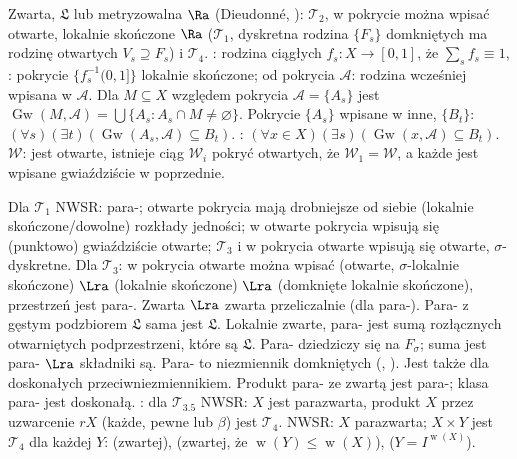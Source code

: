 Zwarta,  $\mathfrak L$ lub metryzowalna $\Ra$  (Dieudonné, ): $\mathcal T_2$, w pokrycie można wpisać otwarte, lokalnie skończone $\Ra$  ($\mathcal T_1$, dyskretna rodzina $\{F_s\}$ domkniętych ma rodzinę otwartych $V_s \supseteq F_s$) i $\mathcal T_4$.
: rodzina ciągłych $f_s \colon X \to [0,1]$, że $\sum_s f_s \equiv 1$, : pokrycie $\{f^{-1}_s(0,1]\}$ lokalnie skończone;  od pokrycia $\mathcal A$: rodzina wcześniej wpisana w $\mathcal A$.
Dla $M \subseteq X$  względem pokrycia $\mathcal A = \{A_s\}$ jest $\operatorname{Gw}(M, \mathcal A)  = \bigcup\{A_s : A_s \cap M \neq \varnothing\}$.
Pokrycie $\{A_s\}$ wpisane  w inne, $\{B_t\}$: $(\forall s)(\exists t)(\operatorname{Gw}(A_s, \mathcal A) \subseteq B_t)$.
: $(\forall x \in X)(\exists s)(\operatorname{Gw}(x, \mathcal A) \subseteq B_t)$.
 $\mathcal W$: jest otwarte, istnieje ciąg $\mathcal W_i$ pokryć otwartych, że $\mathcal W_1 = \mathcal W$, a każde jest wpisane gwiaździście w poprzednie.

Dla $\mathcal T_1$ NWSR: para-; otwarte pokrycia mają drobniejsze od siebie (lokalnie skończone/dowolne) rozkłady jedności; w otwarte pokrycia wpisują się (punktowo) gwiaździście otwarte; $\mathcal T_3$ i w pokrycia otwarte wpisują się otwarte, $\sigma$-dyskretne.
Dla $\mathcal T_3$: w pokrycia otwarte można wpisać (otwarte, $\sigma$-lokalnie skończone) $\Lra$ (lokalnie skończone) $\Lra$ (domknięte lokalnie skończone), przestrzeń jest para-.
Zwarta $\Lra$ zwarta przeliczalnie (dla para-).
Para- z gęstym podzbiorem $\mathfrak L$ sama jest $\mathfrak L$.
Lokalnie zwarte, para- jest sumą rozłącznych otwarniętych podprzestrzeni, które są $\mathfrak L$.
Para- dziedziczy się na $F_\sigma$; suma jest para- $\Lra$ składniki są.
Para- to niezmiennik domkniętych (, ).
Jest także dla doskonałych przeciwniezmiennikiem.
Produkt para- ze zwartą jest para-; klasa para- jest doskonałą.
: dla $\mathcal T_{3.5}$ NWSR: $X$ jest parazwarta, produkt $X$ przez uzwarcenie $rX$ (każde, pewne lub $\beta$) jest $\mathcal T_4$.
NWSR: $X$ parazwarta; $X \times Y$ jest $\mathcal T_4$ dla każdej $Y$: (zwartej), (zwartej, że $\operatorname{w}(Y) \le \operatorname{w}(X)$), ($ Y=I^{\operatorname{w}(X)}$).

